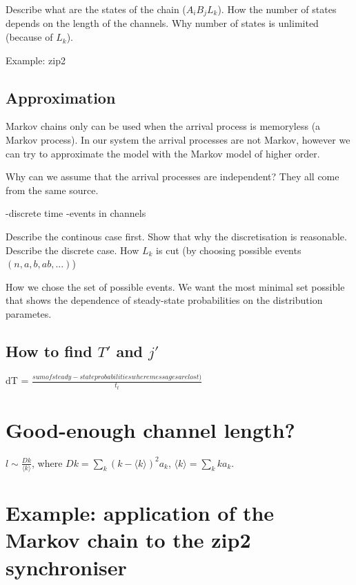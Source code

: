Describe what are the states of the chain ($A_{i} B_{j} L_{k}$). How the number of states depends on the length of the channels. Why number of states is unlimited (because of $L_{k}$).

Example: zip2
  \subsection{Approximation}
Markov chains only can be used when the arrival process is memoryless (a Markov process). In our system the arrival processes are not Markov, however we can try to approximate the model with the Markov model of higher order.

Why can we assume that the arrival processes are independent? They all come from the same source.

-discrete time
-events in channels

Describe the continous case first. Show that why the discretisation is reasonable.
Describe the discrete case. How $L_{k}$ is cut (by choosing possible events $(n,a,b,ab,...)$)

How we chose the set of possible events. We want the most minimal set possible that shows the dependence of steady-state probabilities on the distribution parametes.

  \subsection{How to find $T'$ and $j'$}
dT = $\frac{sum of steady-state probabilities where messages are lost)}{t_{t}}$

\section{Good-enough channel length?}
$l \sim \frac{Dk}{\langle k \rangle}$, where $Dk = \sum_{k} (k - \langle k \rangle)^{2} a_{k}$, $\langle k \rangle = \sum_{k} k a_{k}$.


\section{Example: application of the Markov chain to the zip2 synchroniser}
